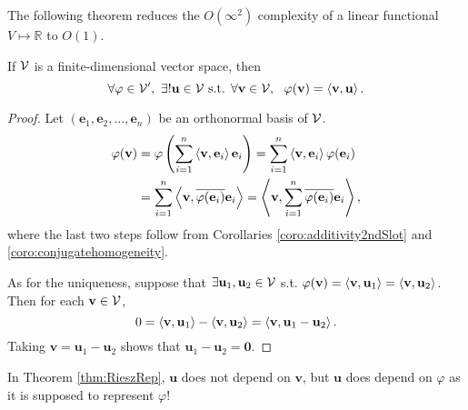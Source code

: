 \begin{rem}
  The following theorem reduces
  the $O(\infty^2)$ complexity of a linear functional
  $V\mapsto \mathbb{R}$
  to $O(1)$.
\end{rem}

\begin{thm}
  \label{thm:RieszRep}
  If ${\cal V}$ is a finite-dimensional vector space, 
  then
  \begin{equation}
    \label{eq:RieszRep}
    \forall \varphi\in {\cal V}',\ 
    \exists! \mathbf{u}\in {\cal V} \text{ s.t. }
    \forall \mathbf{v}\in {\cal V},\ \  \varphi(\mathbf{v}) = \innerProd{\mathbf{v},\mathbf{u}}.
  \end{equation}
\end{thm}
\begin{proof}
  Let $(\mathbf{e}_1,\mathbf{e}_2, \ldots, \mathbf{e}_n)$
  be an orthonormal basis of ${\cal V}$.
  \begin{align*}
    \varphi(\mathbf{v})
    &= \varphi\left(
      \sum_{i=1}^n\left\langle \mathbf{v}, \mathbf{e}_i \right\rangle \mathbf{e}_i\right)
      = \sum_{i=1}^n\left\langle \mathbf{v}, \mathbf{e}_i \right\rangle \varphi(\mathbf{e}_i)
    \\
    &=\sum_{i=1}^n\left\langle \mathbf{v}, \overline{\varphi(\mathbf{e}_i)}
      \mathbf{e}_i \right\rangle 
      =\left\langle \mathbf{v},  \sum_{i=1}^n\overline{\varphi(\mathbf{e}_i)}
      \mathbf{e}_i \right\rangle,
  \end{align*}
  where the last two steps follow from
  Corollaries \ref{coro:additivity2ndSlot}
  and \ref{coro:conjugatehomogeneity}.

  As for the uniqueness,
  suppose that $\exists \mathbf{u}_1, \mathbf{u}_2\in {\cal V}$
  s.t. $\varphi(\mathbf{v})=\left\langle \mathbf{v},\mathbf{u}_1 \right\rangle
  =\left\langle \mathbf{v},\mathbf{u}_2 \right\rangle$.
  Then for each $\mathbf{v}\in {\cal V}$,
  \begin{displaymath}
    0=\left\langle \mathbf{v},\mathbf{u}_1 \right\rangle-\left\langle \mathbf{v},\mathbf{u}_2 \right\rangle
    = \left\langle \mathbf{v},\mathbf{u}_1-\mathbf{u}_2 \right\rangle.
  \end{displaymath}
  Taking $\mathbf{v}=\mathbf{u}_1-\mathbf{u}_2$
  shows that $\mathbf{u}_1-\mathbf{u}_2=\mathbf{0}$.
\end{proof}

\begin{rem}
  In Theorem \ref{thm:RieszRep},
  $\mathbf{u}$ does not depend on $\mathbf{v}$, 
  but $\mathbf{u}$ does depend on $\varphi$
  as it is supposed to represent $\varphi$!
\end{rem}


